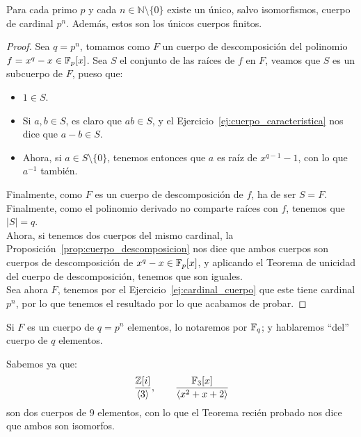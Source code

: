 \begin{teo}
    Para cada primo $p$ y cada $n\in \mathbb{N}\setminus\{0\}$ existe un único, salvo isomorfismos, cuerpo de cardinal $p^n$. Además, estos son los únicos cuerpos finitos.
    \begin{proof}
        Sea $q=p^n$, tomamos como $F$ un cuerpo de descomposición del polinomio $f=x^q-x\in \mathbb{F}_p[x]$. Sea $S$ el conjunto de las raíces de $f$ en $F$, veamos que $S$ es un subcuerpo de $F$, pueso que:
        \begin{itemize}
            \item $1\in S$.
            \item Si $a,b\in S$, es claro que $ab\in S$, y el Ejercicio~\ref{ej:cuerpo_caracteristica} nos dice que $a-b\in S$.
            \item Ahora, si $a\in S\setminus\{0\}$, tenemos entonces que $a$ es raíz de $x^{q-1}-1$, con lo que $a^{-1}$ también. %
        \end{itemize}
        Finalmente, como $F$ es un cuerpo de descomposición de $f$, ha de ser $S = F$. Finalmente, como el polinomio derivado no comparte raíces con $f$, tenemos que $|S| = q$.\\

        \noindent
    Ahora, si tenemos dos cuerpos del mismo cardinal, la Proposición~\ref{prop:cuerpo_descomposicion} nos dice que ambos cuerpos son cuerpos de descomposición de $x^q-x\in \mathbb{F}_p[x]$, y aplicando el Teorema de unicidad del cuerpo de descomposición, tenemos que son iguales.\\

    \noindent
    Sea ahora $F$, tenemos por el Ejercicio~\ref{ej:cardinal_cuerpo} que este tiene cardinal $p^n$, por lo que tenemos el resultado por lo que acabamos de probar.
    \end{proof}
\end{teo}

\begin{notacion}
    Si $F$ es un cuerpo de $q=p^n$ elementos, lo notaremos por $\mathbb{F}_q$; y hablaremos ``del'' cuerpo de $q$ elementos.
\end{notacion}

\begin{ejemplo}
    Sabemos ya que:
    \begin{equation*}
        \dfrac{\mathbb{Z}[i]}{\langle 3 \rangle }, \qquad \dfrac{\mathbb{F}_3[x]}{\langle x^2+x+2 \rangle }
    \end{equation*}
    son dos cuerpos de $9$ elementos, con lo que el Teorema recién probado nos dice que ambos son isomorfos.
\end{ejemplo}

